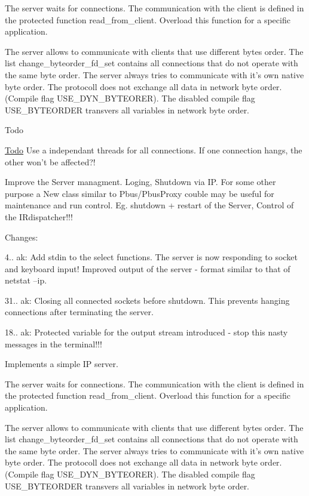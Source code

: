 The server waits for connections. The communication with the client is defined in the protected function read\-\_\-from\-\_\-client. Overload this function for a specific application.

The server allows to communicate with clients that use different bytes order. The list change\-\_\-byteorder\-\_\-fd\-\_\-set contains all connections that do not operate with the same byte order. The server always tries to communicate with it's own native byte order. The protocoll does not exchange all data in network byte order. (Compile flag U\-S\-E\-\_\-\-D\-Y\-N\-\_\-\-B\-Y\-T\-E\-O\-R\-E\-R). The disabled compile flag U\-S\-E\-\_\-\-B\-Y\-T\-E\-O\-R\-D\-E\-R transvers all variables in network byte order.

\begin{DoxyRefDesc}{Todo}
\item[\hyperlink{todo__todo000001}{Todo}]Use a independant threads for all connections. If one connection hangs, the other won't be affected?! 

Improve the Server managment. Loging, Shutdown via I\-P. For some other purpose a New class similar to Pbus/\-Pbus\-Proxy couble may be useful for maintenance and run control. Eg. shutdown + restart of the Server, Control of the I\-Rdispatcher!!!\end{DoxyRefDesc}


Changes\-: \begin{DoxyItemize}
\item 4.. ak\-: Add stdin to the select functions. The server is now responding to socket and keyboard input! Improved output of the server -\/ format similar to that of netstat --ip. \item 31.. ak\-: Closing all connected sockets before shutdown. This prevents hanging connections after terminating the server. \item 18.. ak\-: Protected variable for the output stream introduced -\/ stop this nasty messages in the terminal!!!\end{DoxyItemize}
Implements a simple I\-P server.

The server waits for connections. The communication with the client is defined in the protected function read\-\_\-from\-\_\-client. Overload this function for a specific application.

The server allows to communicate with clients that use different bytes order. The list change\-\_\-byteorder\-\_\-fd\-\_\-set contains all connections that do not operate with the same byte order. The server always tries to communicate with it's own native byte order. The protocoll does not exchange all data in network byte order. (Compile flag U\-S\-E\-\_\-\-D\-Y\-N\-\_\-\-B\-Y\-T\-E\-O\-R\-E\-R). The disabled compile flag U\-S\-E\-\_\-\-B\-Y\-T\-E\-O\-R\-D\-E\-R transvers all variables in network byte order.

